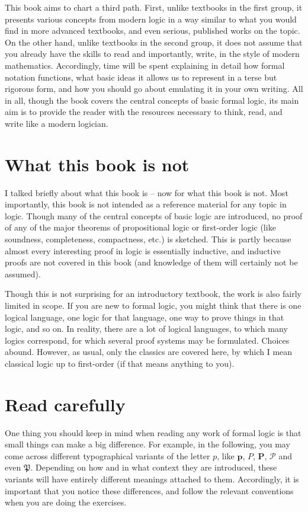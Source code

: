 This book aims to chart a third path. First, unlike textbooks in the first group, it presents various concepts from modern logic in a way similar to what you would find in more advanced textbooks, and even serious, published works on the topic. On the other hand, unlike textbooks in the second group, it does not assume that you already have the skills to read and importantly, write, in the style of modern mathematics. Accordingly, time will be spent explaining in detail how formal notation functions, what basic ideas it allows us to represent in a terse but rigorous form, and how you should go about emulating it in your own writing. All in all, though the book covers the central concepts of basic formal logic, its main aim is to provide the reader with the resources necessary to think, read, and write like a modern logician. 

\section*{What this book is not}

I talked briefly about what this book is -- now for what this book is not. Most importantly, this book is not intended as a reference material for any topic in logic. Though many of the central concepts of basic logic are introduced, no proof of any of the major theorems of propositional logic or first-order logic (like soundness, completeness, compactness, etc.) is sketched. This is partly because almost every interesting proof in logic is essentially inductive, and inductive proofs are not covered in this book (and knowledge of them will certainly not be assumed). 

Though this is not surprising for an introductory textbook, the work is also fairly limited in scope. If you are new to formal logic, you might think that there is one logical language, one logic for that language, one way to prove things in that logic, and so on. In reality, there are a lot of logical languages, to which many logics correspond, for which several proof systems may be formulated. Choices abound. However, as usual, only the classics are covered here, by which I mean classical logic up to first-order (if that means anything to you).   

\section*{Read carefully}

One thing you should keep in mind when reading any work of formal logic is that small things can make a big difference. For example, in the following, you may come across different typographical variants of the letter $p$, like $\mathbf{p}$, $P$, $\mathbf{P}$, $\mathcal{P}$ and even $\mathfrak{P}$. Depending on how and in what context they are introduced, these variants will have entirely different meanings attached to them. Accordingly, it is important that you notice these differences, and follow the relevant conventions when you are doing the exercises. 

